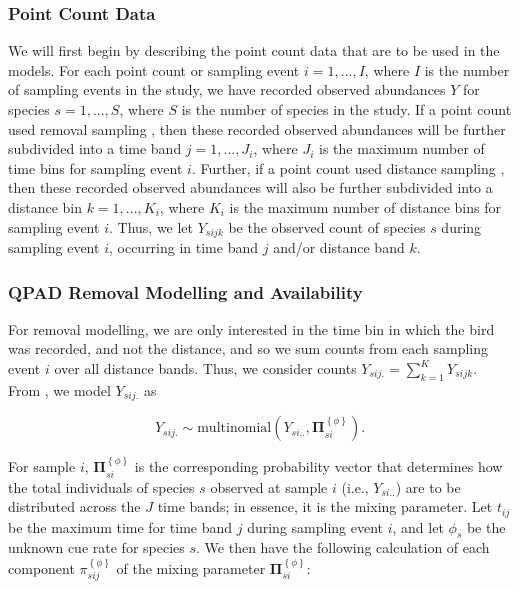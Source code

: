 \documentclass[12pt]{article}
\begin{document}
\subsubsection{Point Count Data}
\par We will first begin by describing the point count data that are to be used in the models.
For each point count or sampling event $i = 1,...,I$, where $I$ is the number of sampling events in the study, we have recorded observed abundances $Y$ for species $s = 1,...,S$, where $S$ is the number of species in the study.
If a point count used removal sampling \citep{alldredge_time--detection_2007, farnsworth_removal_2002}, then these recorded observed abundances will be further subdivided into a time band $j = 1,...,J_i$, where $J_i$ is the maximum number of time bins for sampling event $i$.
Further, if a point count used distance sampling \citep{buckland_introduction_2001, buckland_distance_2015}, then these recorded observed abundances will also be further subdivided into a distance bin $k = 1,...,K_i$, where $K_i$ is the maximum number of distance bins for sampling event $i$.
Thus, we let $Y_{sijk}$ be the observed count of species $s$ during sampling event $i$, occurring in time band $j$ and/or distance band $k$.

\subsubsection{QPAD Removal Modelling and Availability}
\par For removal modelling, we are only interested in the time bin in which the bird was recorded, and not the distance, and so we sum counts from each sampling event $i$ over all distance bands. 
Thus, we consider counts $Y_{sij.} = \sum_{k=1}^{K}{Y}_{sijk}$. 
From \citet{solymos_calibrating_2013}, we model $Y_{sij.}$ as

$${Y}_{sij.} \sim \mathrm{multinomial}\left({Y}_{si..}, \mathbf{\Pi}_{si}^{\left\{\phi\right\}}\right).$$

\par For sample $i$, $\mathbf{\Pi}_{si}^{\left\{\phi\right\}}$ is the corresponding probability vector that determines how the total individuals of species $s$ observed at sample $i$ (i.e., ${Y}_{si..}$) are to be distributed across the $J$ time bands; in essence, it is the mixing parameter.
Let $t_{ij}$ be the maximum time for time band $j$ during sampling event $i$, and let $\phi_s$ be the unknown cue rate for species $s$.
We then have the following calculation of each component $\pi_{sij}^{\left\{\phi\right\}}$ of the mixing parameter $\mathbf{\Pi}_{si}^{\left\{\phi\right\}}$:
\end{document}
